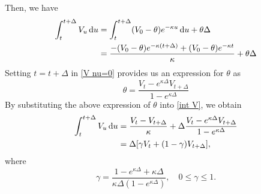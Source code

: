 \documentclass{ws-ijfe}
\begin{document}
Then, we have
\begin{equation}\label{int V}
  \begin{split}
    \int_{t}^{t+\Delta}V_u\,\d u&=\int_{t}^{t+\Delta}(V_0-\theta)e^{-\kappa u}\,\d u +\theta\Delta\\
    &=\frac{-(V_0-\theta)e^{-\kappa(t+\Delta)}+(V_0-\theta)e^{-\kappa t}}{\kappa}+\theta\Delta\\
  \end{split}
\end{equation}
Setting $t=t+\Delta$ in \eqref{V nu=0} provides us an expression for $\theta$ as%
\begin{equation*}
\theta=\frac{V_t-e^{\kappa\Delta}V_{t+\Delta}}{1-e^{\kappa\Delta}}
\end{equation*}
By substituting the above expression of $\theta$ into \eqref{int V}, we obtain
\begin{equation*}
  \begin{split}
    \int_{t}^{t+\Delta}V_u\,\mathrm{d} u &= \frac{V_t-V_{t+\Delta}}{\kappa}+\Delta\frac{V_t-e^{\kappa\Delta}V_{t+\Delta}}{1-e^{\kappa\Delta}}  \\
     &=\Delta[\gamma V_t+(1-\gamma) V_{t+\Delta}],
  \end{split}
\end{equation*}
where
\begin{equation}\label{eq:gamma}
  \gamma = \frac{1-e^{\kappa\Delta}+\kappa\Delta}{\kappa\Delta(1-e^{\kappa\Delta})},\quad 0\leq\gamma\leq1.
\end{equation}
\end{document}
